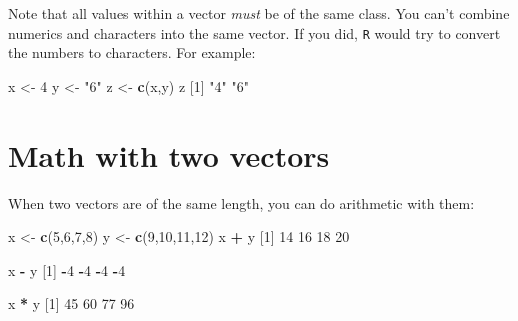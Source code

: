 \documentclass[
]{book}
\newenvironment{Shaded}{\begin{snugshade}}{\end{snugshade}}
\newcommand{\DecValTok}[1]{\textcolor[rgb]{0.00,0.00,0.81}{#1}}
\newcommand{\FunctionTok}[1]{\textcolor[rgb]{0.13,0.29,0.53}{\textbf{#1}}}
\newcommand{\NormalTok}[1]{#1}
\newcommand{\OtherTok}[1]{\textcolor[rgb]{0.56,0.35,0.01}{#1}}
\newcommand{\SpecialCharTok}[1]{\textcolor[rgb]{0.81,0.36,0.00}{\textbf{#1}}}
\newcommand{\StringTok}[1]{\textcolor[rgb]{0.31,0.60,0.02}{#1}}
\begin{document}
Note that all values within a vector \emph{must} be of the same class. You can't combine numerics and characters into the same vector. If you did, \texttt{R} would try to convert the numbers to characters. For example:

\begin{Shaded}
\begin{Highlighting}[]
\NormalTok{x }\OtherTok{\textless{}{-}} \DecValTok{4}
\NormalTok{y }\OtherTok{\textless{}{-}} \StringTok{"6"}
\NormalTok{z }\OtherTok{\textless{}{-}} \FunctionTok{c}\NormalTok{(x,y)}
\NormalTok{z}
\NormalTok{[}\DecValTok{1}\NormalTok{] }\StringTok{"4"} \StringTok{"6"}
\end{Highlighting}
\end{Shaded}

\section*{Math with two vectors}\label{math-with-two-vectors}

When two vectors are of the same length, you can do arithmetic with them:

\begin{Shaded}
\begin{Highlighting}[]
\NormalTok{x }\OtherTok{\textless{}{-}} \FunctionTok{c}\NormalTok{(}\DecValTok{5}\NormalTok{,}\DecValTok{6}\NormalTok{,}\DecValTok{7}\NormalTok{,}\DecValTok{8}\NormalTok{)}
\NormalTok{y }\OtherTok{\textless{}{-}} \FunctionTok{c}\NormalTok{(}\DecValTok{9}\NormalTok{,}\DecValTok{10}\NormalTok{,}\DecValTok{11}\NormalTok{,}\DecValTok{12}\NormalTok{)}
\NormalTok{x }\SpecialCharTok{+}\NormalTok{ y}
\NormalTok{[}\DecValTok{1}\NormalTok{] }\DecValTok{14} \DecValTok{16} \DecValTok{18} \DecValTok{20}
\end{Highlighting}
\end{Shaded}

\begin{Shaded}
\begin{Highlighting}[]
\NormalTok{x }\SpecialCharTok{{-}}\NormalTok{ y}
\NormalTok{[}\DecValTok{1}\NormalTok{] }\SpecialCharTok{{-}}\DecValTok{4} \SpecialCharTok{{-}}\DecValTok{4} \SpecialCharTok{{-}}\DecValTok{4} \SpecialCharTok{{-}}\DecValTok{4}
\end{Highlighting}
\end{Shaded}

\begin{Shaded}
\begin{Highlighting}[]
\NormalTok{x }\SpecialCharTok{*}\NormalTok{ y}
\NormalTok{[}\DecValTok{1}\NormalTok{] }\DecValTok{45} \DecValTok{60} \DecValTok{77} \DecValTok{96}
\end{Highlighting}
\end{Shaded}
\end{document}

